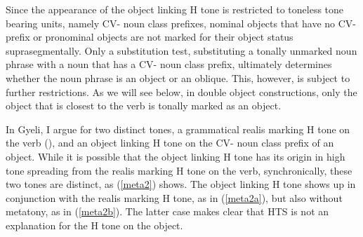 \noindent Since the appearance of the object linking H tone is restricted to toneless tone bearing units, namely CV- noun class prefixes, nominal objects that have no CV- prefix or pronominal objects are not marked for their object status suprasegmentally. Only a substitution test, substituting a tonally unmarked noun phrase with a noun that has a  CV- noun class prefix, ultimately determines whether the noun phrase is an object or an oblique. This, however, is subject to further restrictions. As we will see below, in double object constructions, only the object that is closest to the verb is tonally marked as an object.





In Gyeli, I argue for two distinct tones, a grammatical realis marking H tone on the verb (), and an object linking H tone on the CV- noun class prefix of an object. While it is possible that the object linking H tone has its origin in high tone spreading from the realis marking H tone on the verb, synchronically, these two tones are distinct, as (\ref{meta2}) shows. The object linking H tone shows up in conjunction with the realis marking H tone, as in (\ref{meta2a}), but also without metatony, as in (\ref{meta2b}). The latter case makes clear that HTS is not an explanation for the H tone on the object.

